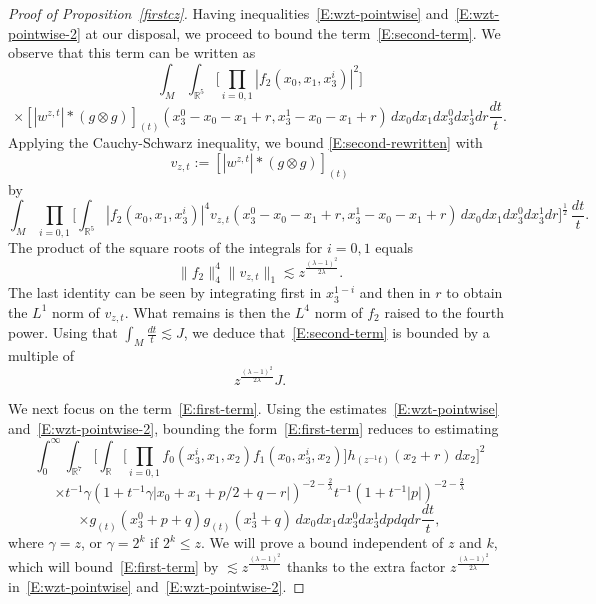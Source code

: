 \documentclass[12pt,reqno]{amsart}
\theoremstyle{plain}
\theoremstyle{definition}
\numberwithin{equation}{section}
\newcommand{\R}{{\mathbb R}}
\begin{document}
\begin{proof}[Proof of Proposition~\ref{firstcz}]
Having inequalities~\eqref{E:wzt-pointwise} and~\eqref{E:wzt-pointwise-2} at our disposal, we proceed to bound the term~\eqref{E:second-term}.
We observe that this term can be written as
\begin{equation}\label{E:second-rewritten}
\int_{M} \int_{\R^5}  \Big[\prod_{i=0,1} |f_{2}(x_0,x_1,x_3^i)|^2 \Big ]  
\end{equation}
\begin{equation*}
\times [|w^{z,t}| \ast (g \otimes g)]_{(t)}(x_3^0-x_0-x_1+r, x_3^1-x_0-x_1+r) 
\, dx_0 dx_1 dx_3^0 dx_3^1 dr \frac{dt}{t}.
\end{equation*}
Applying the  Cauchy-Schwarz inequality, we bound \eqref{E:second-rewritten}  with \[v_{z,t}:=[|w^{z,t}| \ast (g \otimes g)]_{(t)}\] by
\begin{equation*}
    \int_M \prod_{i=0,1}\Big[\int_{\R^5}|f_2(x_0,x_1,x_3^i)|^4     
v_{z,t}(x_3^0-x_0-x_1+r,x_3^1-x_0-x_1+r) \,  dx_0 dx_1 dx_3^0 dx_3^1 dr \Big]^{\frac 1 2}   \,\frac{dt}{t}.
\end{equation*}
The product of the square roots of the integrals for $i=0,1$ equals
\begin{equation*}
    \|f_2\|_4^4 \|v_{z,t}\|_1\lesssim z^{\frac{(\lambda-1)^2}{2\lambda}}.
\end{equation*}
The last identity can be seen by integrating first 
in $x_3^{1-i}$ and then in $r$ to obtain the $L^1$ norm of $v_{z,t}$. What remains is then the $L^4$ norm of $f_2$ raised to the fourth power.
Using that $\int_M \frac{dt}{t} \lesssim J$, we deduce that~\eqref{E:second-term} is bounded by a multiple of \[z^{\frac{(\lambda-1)^2}{2\lambda}}J.\]

 
We next focus on the term~\eqref{E:first-term}.
Using the estimates~\eqref{E:wzt-pointwise} and~\eqref{E:wzt-pointwise-2}, bounding the form~\eqref{E:first-term} reduces to estimating
\begin{equation*}
\int_{0}^\infty \int_{\R^7} 
\Big[
\int_{\R} \Big[  \prod_{i=0,1} f_0(x_3^i,x_1,x_2) f_1(x_0,x_3^i,x_2) \Big] h_{(z^{-1}t)}(x_2+r) \,dx_2 \Big]^2 
\end{equation*}
\begin{equation*}
\times t^{-1} \gamma (1+t^{-1}\gamma|x_0+x_1+p/2+q-r|)^{-2-\frac{2}{\lambda}}
t^{-1}(1+t^{-1}|p|)^{-2-\frac{2}{\lambda}}  
\end{equation*}
\begin{equation*}
\times g_{(t)}(x_3^0+p+q)
g_{(t)}(x_3^1+q) \,
dx_0 dx_1 dx_3^0 dx_3^1 dp dq dr \frac{dt}{t},
\end{equation*}
where $\gamma=z$, or $\gamma=2^{k}$ if $2^k \leq z$. We will prove a bound independent of $z$ and $k$, which will bound~\eqref{E:first-term} by $\lesssim z^{\frac{(\lambda-1)^2}{2\lambda}}$ thanks to the extra factor $z^{\frac{(\lambda-1)^2}{2\lambda}}$ in~\eqref{E:wzt-pointwise} and~\eqref{E:wzt-pointwise-2}.


\end{proof}
\end{document}
